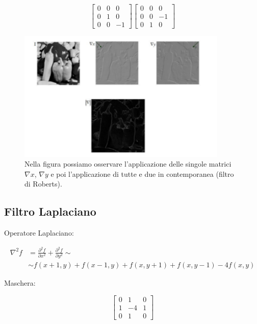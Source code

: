 \begin{center}
    \[
        \begin{bmatrix}
            0 & 0 & 0  \\
            0 & 1 & 0  \\
            0 & 0 & -1
        \end{bmatrix}
        \begin{bmatrix}
            0 & 0 & 0  \\
            0 & 0 & -1 \\
            0 & 1 & 0
        \end{bmatrix}
    \]
\end{center}

\begin{figure}[H]
    \centering
    \includegraphics[width=10cm, keepaspectratio]{capitoli/immagini/imgs/roberts.png}
    \caption{Nella figura possiamo osservare l'applicazione delle singole matrici $\nabla x$, $\nabla y$ e poi l'applicazione di tutte e due in contemporanea (filtro di Roberts).}
\end{figure}

\subsection{Filtro Laplaciano}

Operatore Laplaciano:

\begin{align*}
    \nabla^2 f & = \frac{\partial^2{f}}{\partial{x^2}} + \frac{\partial^2{f}}{\partial{y^2}} \sim \\
               & \sim f(x+1,y)+f(x-1,y)+f(x,y+1)+f(x,y-1)-4f(x,y)
\end{align*}

Maschera:

\begin{center}
    \[
        \begin{bmatrix}
            0 & 1  & 0 \\
            1 & -4 & 1 \\
            0 & 1  & 0
        \end{bmatrix}
    \]
\end{center}

